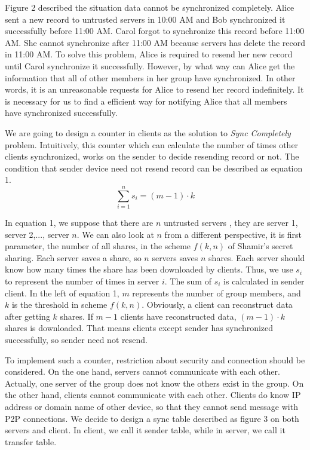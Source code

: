 \documentclass[twocolumn,10pt]{article}
\begin{document}
Figure 2 described the situation data cannot be synchronized completely. Alice sent a new record to untrusted servers in 10:00 AM and Bob synchronized it successfully before 11:00 AM. Carol forgot to synchronize this record before 11:00 AM. She cannot synchronize after 11:00 AM because servers has delete the record in 11:00 AM. To solve this problem, Alice is required to resend her new record until Carol synchronize it successfully. However, by what way can Alice get the information that all of other members in her group have synchronized. In other words, it is an unreasonable requests for Alice to resend her record indefinitely. It is necessary for us to find a efficient way for notifying Alice that all members have synchronized successfully.

We are going to design a counter in clients as the solution to \emph{Sync Completely} problem. Intuitively, this counter which can calculate the number of times other clients synchronized, works on the sender to decide resending record or not. The condition that sender device need not resend record can be described as equation 1.
\begin{equation}
\sum_{i=1}^{n}s_{i}=(m-1)\cdot k
\end{equation}

In equation 1, we suppose that there are $n$ untrusted servers , they are server 1, server 2,..., server $n$. We can also look at $n$ from a different perspective, it is first parameter, the number of all shares, in the scheme $f(k, n)$ of Shamir's secret sharing. Each server saves a share, so $n$ servers saves $n$ shares. Each server should know how many times the share has been downloaded by clients. Thus, we use $s_i$ to represent the number of times in server $i$. The sum of $s_i$ is calculated in sender client. In the left of equation 1, $m$ represents the number of group members, and $k$ is the threshold in scheme $f(k, n)$. Obviously, a client can reconstruct data after getting $k$ shares. If $m-1$ clients have reconstructed data, $(m-1)\cdot k$ shares is downloaded. That means clients except sender has synchronized successfully, so sender need not resend.

To implement such a counter, restriction about security and connection should be considered. On the one hand, servers cannot communicate with each other. Actually, one server of the group does not know the others exist in the group. On the other hand, clients cannot communicate with each other. Clients do know IP address or domain name of other device, so that they cannot send message with P2P connections. We decide to design a sync table described as figure 3 on both servers and client. In client, we call it sender table, while in server, we call it transfer table. 
\end{document}
